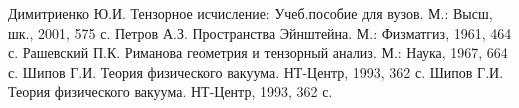 \documentclass[14pt,a4paper]{extarticle}
\begin{document}
\clearpage
{}
\begin{thebibliography}{3}
	Димитриенко Ю.И. Тензорное исчисление: Учеб.пособие для вузов. М.: Высш,	шк., 2001, 575 с.
	Петров А.З. Пространства Эйнштейна. М.: Физматгиз, 1961, 464 с.
	Рашевский П.К. Риманова геометрия и тензорный анализ. М.: Наука, 1967, 664 с.
	Шипов Г.И. Теория физического вакуума. НТ-Центр, 1993, 362 с.
	Шипов Г.И. Теория физического вакуума. НТ-Центр, 1993, 362 с.
\end{thebibliography}
\end{document}
